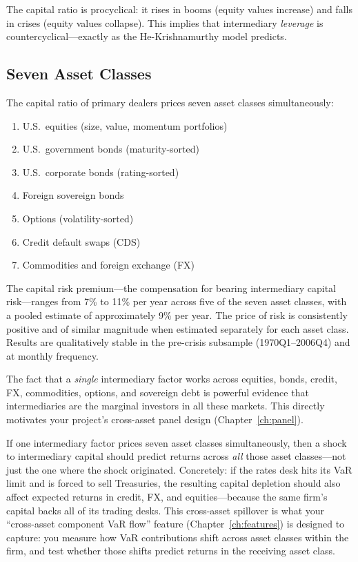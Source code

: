 The capital ratio is procyclical: it rises in booms (equity values increase) and falls in crises (equity values collapse). This implies that intermediary \emph{leverage} is countercyclical---exactly as the He-Krishnamurthy model predicts.

\subsection{Seven Asset Classes}

\begin{keyresult}
The capital ratio of primary dealers prices seven asset classes simultaneously:
\begin{enumerate}[nosep]
  \item U.S.\ equities (size, value, momentum portfolios)
  \item U.S.\ government bonds (maturity-sorted)
  \item U.S.\ corporate bonds (rating-sorted)
  \item Foreign sovereign bonds
  \item Options (volatility-sorted)
  \item Credit default swaps (CDS)
  \item Commodities and foreign exchange (FX)
\end{enumerate}
The capital risk premium---the compensation for bearing intermediary capital risk---ranges from 7\% to 11\% per year across five of the seven asset classes, with a pooled estimate of approximately 9\% per year. The price of risk is consistently positive and of similar magnitude when estimated separately for each asset class. Results are qualitatively stable in the pre-crisis subsample (1970Q1--2006Q4) and at monthly frequency.
\end{keyresult}

The fact that a \emph{single} intermediary factor works across equities, bonds, credit, FX, commodities, options, and sovereign debt is powerful evidence that intermediaries are the marginal investors in all these markets. This directly motivates your project's cross-asset panel design (Chapter~\ref{ch:panel}).

\begin{keyidea}
If one intermediary factor prices seven asset classes simultaneously, then a shock to intermediary capital should predict returns across \emph{all} those asset classes---not just the one where the shock originated. Concretely: if the rates desk hits its VaR limit and is forced to sell Treasuries, the resulting capital depletion should also affect expected returns in credit, FX, and equities---because the same firm's capital backs all of its trading desks. This cross-asset spillover is what your ``cross-asset component VaR flow'' feature (Chapter~\ref{ch:features}) is designed to capture: you measure how VaR contributions shift across asset classes within the firm, and test whether those shifts predict returns in the receiving asset class.
\end{keyidea}

